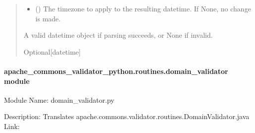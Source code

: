 \documentclass[letterpaper,10pt,english]{sphinxmanual}
\begin{document}
\begin{fulllineitems}
\begin{fulllineitems}
\begin{quote}
\begin{description}
\begin{itemize}
\item {} 
\sphinxAtStartPar
{} (\sphinxstyleliteralemphasis{\sphinxupquote{{[}}}\sphinxstyleliteralemphasis{\sphinxupquote{{]}}}) \textendash{} The timezone to apply to the resulting datetime. If None, no change is made.

\end{itemize}

\sphinxAtStartPar
A valid datetime object if parsing succeeds, or None if invalid.

\sphinxAtStartPar
Optional{[}datetime{]}

\end{description}\end{quote}

\end{fulllineitems}


\end{fulllineitems}



\paragraph{apache\_commons\_validator\_python.routines.domain\_validator module}
\label{\detokenize{apache_commons_validator_python.routines:module-apache_commons_validator_python.routines.domain_validator}}\label{\detokenize{apache_commons_validator_python.routines:apache-commons-validator-python-routines-domain-validator-module}}
\sphinxAtStartPar
Module Name: domain\_validator.py

\sphinxAtStartPar
Description: Translates apache.commons.validator.routines.DomainValidator.java
Link: 
\end{document}
